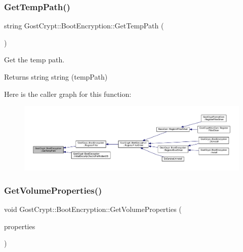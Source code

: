 \subsubsection{\texorpdfstring{Get\+Temp\+Path()}{GetTempPath()}}
{\footnotesize\ttfamily string Gost\+Crypt\+::\+Boot\+Encryption\+::\+Get\+Temp\+Path (\begin{DoxyParamCaption}{ }\end{DoxyParamCaption})}



Get the temp path. 

\begin{DoxyReturn}{Returns}
string string (temp\+Path) 
\end{DoxyReturn}
Here is the caller graph for this function\+:
\nopagebreak
\begin{figure}[H]
\begin{center}
\leavevmode
\includegraphics[width=350pt]{class_gost_crypt_1_1_boot_encryption_ad7d1c3f18b8e3bc9133a1f8cabeb8f4d_icgraph}
\end{center}
\end{figure}
\mbox{\label{class_gost_crypt_1_1_boot_encryption_a8113cd3021864fa8bbd421c33925f83d}} 
\subsubsection{\texorpdfstring{Get\+Volume\+Properties()}{GetVolumeProperties()}}
{\footnotesize\ttfamily void Gost\+Crypt\+::\+Boot\+Encryption\+::\+Get\+Volume\+Properties (\begin{DoxyParamCaption}\item[{V\+O\+L\+U\+M\+E\+\_\+\+P\+R\+O\+P\+E\+R\+T\+I\+E\+S\+\_\+\+S\+T\+R\+U\+CT $\ast$}]{properties }\end{DoxyParamCaption})}



